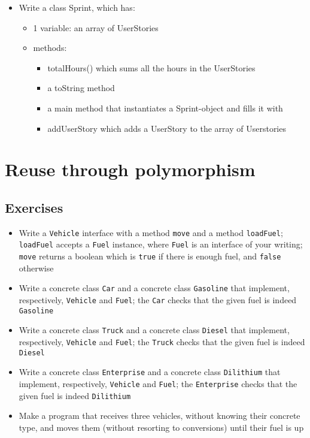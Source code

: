 \begin{enumerate}
\begin{itemize}
                    \item Write a class Sprint, which has:
                         \begin{itemize}
                            \item 1 variable: an array of UserStories
                            \item methods:
                            \begin{itemize}
                                \item totalHours() which sums all the hours in the UserStories
                                \item a toString method
                                \item a main method that instantiates a Sprint-object and fills it with
                                \item addUserStory which adds a UserStory to the array of Userstories
                        \end{itemize}
                    \end{itemize}
                \end{itemize}
    \end{enumerate}

\chapter{Reuse through polymorphism}
    \section{Exercises}
        \begin{itemize}
            \item Write a \texttt{Vehicle} interface with a method \texttt{move} and a method \texttt{loadFuel}; \texttt{loadFuel} accepts a \texttt{Fuel} instance, where \texttt{Fuel} is an interface of your writing; \texttt{move} returns a boolean which is \texttt{true} if there is enough fuel, and \texttt{false} otherwise
            \item Write a concrete class \texttt{Car} and a concrete class \texttt{Gasoline} that implement, respectively, \texttt{Vehicle} and \texttt{Fuel}; the \texttt{Car} checks that the given fuel is indeed \texttt{Gasoline}
            \item Write a concrete class \texttt{Truck} and a concrete class \texttt{Diesel} that implement, respectively, \texttt{Vehicle} and \texttt{Fuel}; the \texttt{Truck} checks that the given fuel is indeed \texttt{Diesel}
            \item Write a concrete class \texttt{Enterprise} and a concrete class \texttt{Dilithium} that implement, respectively, \texttt{Vehicle} and \texttt{Fuel}; the \texttt{Enterprise} checks that the given fuel is indeed \texttt{Dilithium}
            \item Make a program that receives three vehicles, without knowing their concrete type, and moves them (without resorting to conversions) until their fuel is up
        \end{itemize}

